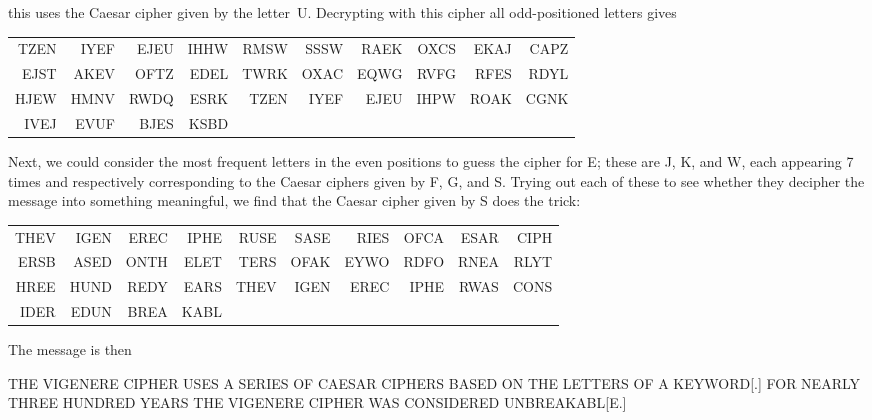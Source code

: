 \documentclass[11pt]{article}
\begin{document}
\begin{itemize}
    this uses the Caesar cipher given by the letter~U.
    Decrypting with this cipher all odd-positioned letters gives
    \begin{center}{\tt\begin{tabular}{rrrrrrrrrr}
      TZEN & IYEF & EJEU & IHHW & RMSW & SSSW & RAEK & OXCS & EKAJ & CAPZ\\
      EJST & AKEV & OFTZ & EDEL & TWRK & OXAC & EQWG & RVFG & RFES & RDYL\\
      HJEW & HMNV & RWDQ & ESRK & TZEN & IYEF & EJEU & IHPW & ROAK & CGNK\\
      IVEJ & EVUF & BJES & KSBD
    \end{tabular}}\end{center}
    Next, we could consider the most frequent letters in the even positions to guess the cipher for E;
    these are J, K, and W, each appearing 7 times and respectively corresponding
    to the Caesar ciphers given by F, G, and S.
    Trying out each of these to see whether they decipher the message into something meaningful,
    we find that the Caesar cipher given by S does the trick:
    \begin{center}{\tt\begin{tabular}{rrrrrrrrrr}
      THEV & IGEN & EREC & IPHE & RUSE & SASE & RIES & OFCA & ESAR & CIPH\\
      ERSB & ASED & ONTH & ELET & TERS & OFAK & EYWO & RDFO & RNEA & RLYT\\
      HREE & HUND & REDY & EARS & THEV & IGEN & EREC & IPHE & RWAS & CONS\\
      IDER & EDUN & BREA & KABL
    \end{tabular}}\end{center}
    The message is then
    \begin{center}
      THE VIGENERE CIPHER USES A SERIES OF CAESAR CIPHERS BASED ON THE LETTERS OF A KEYWORD[.]
      FOR NEARLY THREE HUNDRED YEARS THE VIGENERE CIPHER WAS CONSIDERED UNBREAKABL[E.]
    \end{center}
    \end{itemize}
\end{document}
